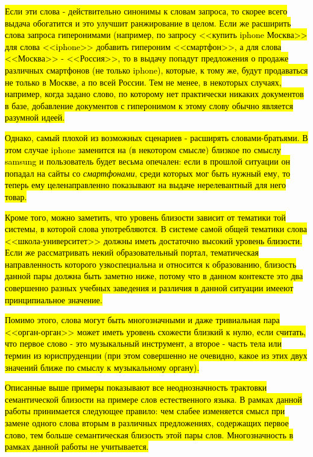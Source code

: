 \hl{Если эти слова - действительно синонимы  к словам запроса, то скорее всего выдача обогатится и это улучшит ранжирование в целом. Если же расширить слова запроса гиперонимами (например, по запросу <<купить iphone Москва>> для слова <<iphone>> добавить гипероним <<смартфон>>, а для слова <<Москва>> - <<Россия>>, то в выдачу попадут предложения о продаже различных смартфонов (не только iphone), которые, к тому же, будут продаваться не только в Москве, а по всей России. Тем не менее, в некоторых случаях, например, когда задано слово, по которому нет практически никаких документов в базе, добавление документов с гиперонимом к этому слову обычно является разумной идеей.}

\hl{Однако, самый плохой из возможных сценариев - расширять словами-братьями. В этом случае iphone заменится на (в некотором смысле) близкое по смыслу samsung и пользователь будет весьма опечален: если в прошлой ситуации он попадал на сайты со \emph{смартфонами}, среди которых мог быть нужный ему, то теперь ему целенаправленно показывают на выдаче нерелевантный для него товар.}

\hl{Кроме того, можно заметить, что уровень близости зависит от тематики той системы, в которой слова употребляются. В системе самой общей тематики слова <<школа-университет>> должны иметь достаточно высокий уровень близости. Если же рассматривать некий образовательный портал, тематическая направленность которого узкоспециальна и относится к образованию, близость данной пары должна быть заметно ниже, потому что в данном контексте это два совершенно разных учебных заведения и различия в данной ситуации имееют принципиальное значение.}

\hl{Помимо этого, слова могут быть многозначными и даже тривиальная пара <<орган-орган>> может иметь уровень схожести близкий к нулю, если считать, что первое слово - это музыкальный инструмент, а второе - часть тела или термин из юриспруденции (при этом совершенно не очевидно, какое из этих двух значений ближе по смыслу к музыкальному органу).}

\hl{Описанные выше примеры показывают все неоднозначность трактовки семантической близости на примере слов естественного языка. В рамках данной работы принимается следующее правило: чем слабее изменяется смысл при замене одного слова вторым в различных предложениях, содержащих первое слово, тем больше семантическая близость этой пары слов. Многозначность в рамках данной работы не учитывается.}

